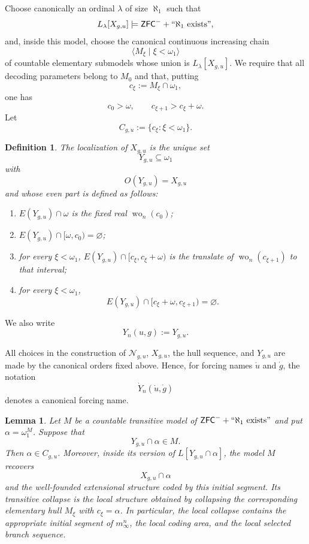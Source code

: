 \documentclass[a4paper,11pt]{article}
\newtheorem{lemma}[theorem]{Lemma}
\newtheorem{definition}[theorem]{Definition}
\newcommand{\ZFCminus}{\mathsf{ZFC}^{-}}
\begin{document}
Choose canonically an ordinal $\lambda$ of size $\aleph_1$ such that
\[
   L_\lambda[X_{g,u}]
   \models\ZFCminus+``\aleph_1\text{ exists}",
\]
and, inside this model, choose the canonical continuous increasing chain
\[
   \langle M_\xi\mid\xi<\omega_1\rangle
\]
of countable elementary submodels whose union is
$L_\lambda[X_{g,u}]$.  We require that all decoding parameters belong to
$M_0$ and that, putting
\[
   c_\xi:=M_\xi\cap\omega_1,
\]
one has
\[
   c_0>\omega,
   \qquad
   c_{\xi+1}>c_\xi+\omega.
\]
Let
\[
   C_{g,u}:=\{c_\xi:\xi<\omega_1\}.
\]

\begin{definition}\label{definition-Mn-localized-code}
The \emph{localization of $X_{g,u}$} is the unique set
\[
   Y_{g,u}\subseteq\omega_1
\]
with
\[
   O(Y_{g,u})=X_{g,u}
\]
and whose even part is defined as follows:
\begin{enumerate}
   \item $E(Y_{g,u})\cap\omega$ is the fixed real
         $\operatorname{wo}_n(c_0)$;
   \item $E(Y_{g,u})\cap[\omega,c_0)=\varnothing$;
   \item for every $\xi<\omega_1$,
         $E(Y_{g,u})\cap[c_\xi,c_\xi+\omega)$ is the translate of
         $\operatorname{wo}_n(c_{\xi+1})$ to that interval;
   \item for every $\xi<\omega_1$,
         \[
            E(Y_{g,u})\cap[c_\xi+\omega,c_{\xi+1})
            =\varnothing.
         \]
\end{enumerate}
\end{definition}
We also write
\[
   Y_n(u,g):=Y_{g,u}.
\]


All choices in the construction of $\mathcal N_{g,u}$, $X_{g,u}$, the hull
sequence, and $Y_{g,u}$ are made by the canonical orders fixed above.  Hence,
for forcing names $\dot u$ and $\dot g$, the notation
\[
   \dot Y_n(\dot u,\dot g)
\]
denotes a canonical forcing name.

\begin{lemma}
\label{lemma-locality-Mn-localization}
Let $M$ be a countable transitive model of
$\ZFCminus+``\aleph_1\text{ exists}"$ and put
$\alpha=\omega_1^M$.  Suppose that
\[
   Y_{g,u}\cap\alpha\in M.
\]
Then $\alpha\in C_{g,u}$.  Moreover, inside its version of
$L[Y_{g,u}\cap\alpha]$, the model $M$ recovers
\[
   X_{g,u}\cap\alpha
\]
and the well-founded extensional structure coded by this initial segment.
Its transitive collapse is the local structure obtained by collapsing the
corresponding elementary hull $M_\xi$ with $c_\xi=\alpha$.  In particular,
the local collapse contains the appropriate initial segment of
$m^n_\infty$, the local coding area, and the local selected branch sequence.
\end{lemma}
\end{document}
